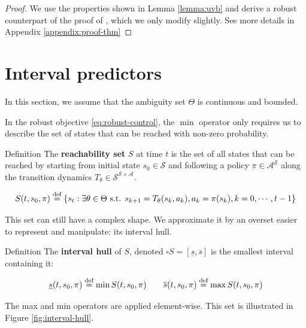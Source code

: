 \documentclass{article}
\newcommand{\interval}[1]{\square #1}
\newcommand{\imin}[1]{\underline{#1}}
\newcommand{\imax}[1]{\overline{#1}}
\newcommand{\eqdef}{\buildrel \text{def}\over =}
\begin{document}
\vspace{-5mm}
\begin{proof}
We use the properties shown in Lemma \ref{lemma:uvb} and derive a robust counterpart of the proof of \citet{Hren2008}, which we only modify slightly. See more details in Appendix \ref{appendix:proof-thm}
\end{proof}

\vspace{-3mm}
\section{Interval predictors}
\label{intervals}

\vspace{-2mm}
In this section, we assume that the ambiguity set $\Theta$ is continuous and bounded.

\vspace{-1mm}
In the robust objective \eqref{eq:robust-control}, the $\min$ operator only requires us to describe the set of states that can be reached with non-zero probability.

\vspace{-2mm}
\begin{paragraph}{Definition}
The \textbf{reachability set} $S$ at time $t$ is the set of all states that can be reached by starting from initial state $s_0 \in \mathcal{S}$ and following a policy $\pi \in \mathcal{A}^\mathcal{S}$ along the transition dynamics $T_\theta \in \mathcal{S}^{\mathcal{S}\times\mathcal{A}}$.

\vspace{-5mm}
\begin{equation}
S(t, s_0, \pi) \eqdef \{s_t: \exists \theta \in \Theta \text{ s.t. } s_{k+1} = T_\theta(s_{k}, a_k), a_k = \pi(s_{k}), k=0, \cdots, t-1\}
\end{equation}
\end{paragraph}

\vspace{-5mm}
This set can still have a complex shape. We approximate it by an overset easier to represent and manipulate: its interval hull.

\vspace{-2mm}
\begin{paragraph}{Definition}
The \textbf{interval hull} of $S$, denoted $\interval{S}=[\imin{s}, \imax{s}]$ is the smallest interval containing it: 

\vspace{-5mm}
\begin{equation}
\label{eq:max-interval}
\underline{s}(t, s_0, \pi) \eqdef \min S(t, s_0, \pi) \qquad \overline{s}(t, s_0, \pi) \eqdef \max S(t, s_0, \pi)
\end{equation}

\vspace{-3mm}\noindent
The max and min operators are applied element-wise. This set is illustrated in Figure \ref{fig:interval-hull}.

\end{paragraph}
\end{document}
